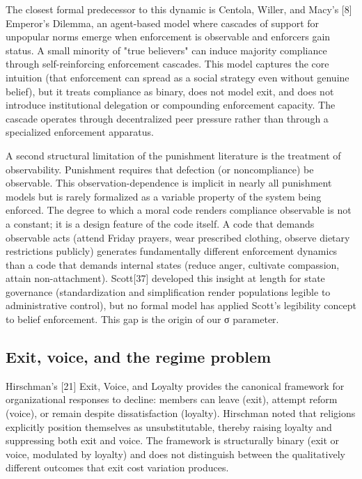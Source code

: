 \documentclass[12pt]{article}
\begin{document}
The closest formal predecessor to this dynamic is Centola, Willer, and Macy's [8] Emperor's Dilemma, an agent-based model where cascades of support for unpopular norms emerge when enforcement is observable and enforcers gain status. A small minority of "true believers" can induce majority compliance through self-reinforcing enforcement cascades. This model captures the core intuition (that enforcement can spread as a social strategy even without genuine belief), but it treats compliance as binary, does not model exit, and does not introduce institutional delegation or compounding enforcement capacity. The cascade operates through decentralized peer pressure rather than through a specialized enforcement apparatus.

A second structural limitation of the punishment literature is the treatment of observability. Punishment requires that defection (or noncompliance) be observable. This observation-dependence is implicit in nearly all punishment models but is rarely formalized as a variable property of the system being enforced. The degree to which a moral code renders compliance observable is not a constant; it is a design feature of the code itself. A code that demands observable acts (attend Friday prayers, wear prescribed clothing, observe dietary restrictions publicly) generates fundamentally different enforcement dynamics than a code that demands internal states (reduce anger, cultivate compassion, attain non-attachment). Scott[37] developed this insight at length for state governance (standardization and simplification render populations legible to administrative control), but no formal model has applied Scott's legibility concept to belief enforcement. This gap is the origin of our σ parameter.

%
\subsection{Exit, voice, and the regime problem}

Hirschman's [21] Exit, Voice, and Loyalty provides the canonical framework for organizational responses to decline: members can leave (exit), attempt reform (voice), or remain despite dissatisfaction (loyalty). Hirschman noted that religions explicitly position themselves as unsubstitutable, thereby raising loyalty and suppressing both exit and voice. The framework is structurally binary (exit or voice, modulated by loyalty) and does not distinguish between the qualitatively different outcomes that exit cost variation produces.
\end{document}
